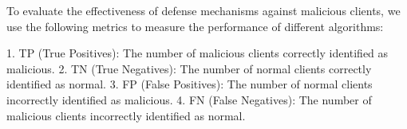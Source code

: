 \documentclass[conference]{IEEEtran}
\begin{document}
To evaluate the effectiveness of defense mechanisms against malicious clients, we use the following metrics to measure the performance of different algorithms:


1. TP (True Positives): The number of malicious clients correctly identified as malicious.
2. TN (True Negatives): The number of normal clients correctly identified as normal.
3. FP (False Positives): The number of normal clients incorrectly identified as malicious.
4. FN (False Negatives): The number of malicious clients incorrectly identified as normal.








\end{document}
